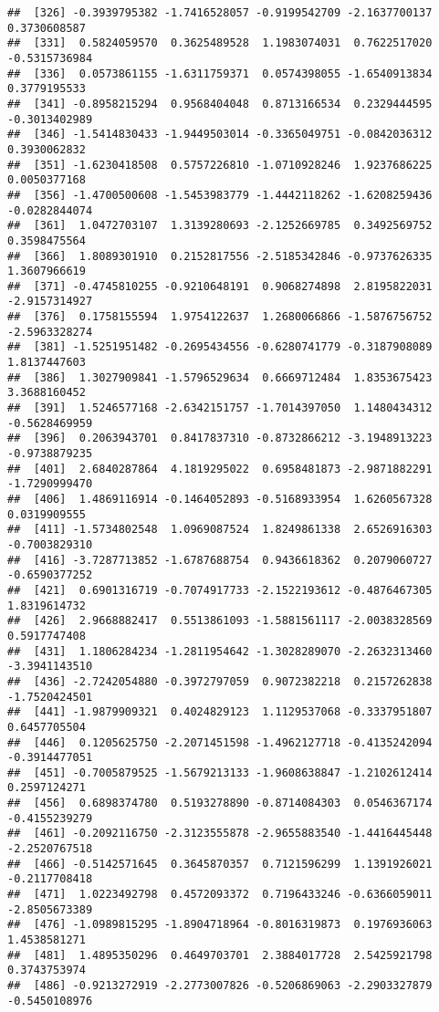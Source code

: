 \documentclass[
]{article}
\begin{document}
\begin{verbatim}
##  [326] -0.3939795382 -1.7416528057 -0.9199542709 -2.1637700137  0.3730608587
##  [331]  0.5824059570  0.3625489528  1.1983074031  0.7622517020 -0.5315736984
##  [336]  0.0573861155 -1.6311759371  0.0574398055 -1.6540913834  0.3779195533
##  [341] -0.8958215294  0.9568404048  0.8713166534  0.2329444595 -0.3013402989
##  [346] -1.5414830433 -1.9449503014 -0.3365049751 -0.0842036312  0.3930062832
##  [351] -1.6230418508  0.5757226810 -1.0710928246  1.9237686225  0.0050377168
##  [356] -1.4700500608 -1.5453983779 -1.4442118262 -1.6208259436 -0.0282844074
##  [361]  1.0472703107  1.3139280693 -2.1252669785  0.3492569752  0.3598475564
##  [366]  1.8089301910  0.2152817556 -2.5185342846 -0.9737626335  1.3607966619
##  [371] -0.4745810255 -0.9210648191  0.9068274898  2.8195822031 -2.9157314927
##  [376]  0.1758155594  1.9754122637  1.2680066866 -1.5876756752 -2.5963328274
##  [381] -1.5251951482 -0.2695434556 -0.6280741779 -0.3187908089  1.8137447603
##  [386]  1.3027909841 -1.5796529634  0.6669712484  1.8353675423  3.3688160452
##  [391]  1.5246577168 -2.6342151757 -1.7014397050  1.1480434312 -0.5628469959
##  [396]  0.2063943701  0.8417837310 -0.8732866212 -3.1948913223 -0.9738879235
##  [401]  2.6840287864  4.1819295022  0.6958481873 -2.9871882291 -1.7290999470
##  [406]  1.4869116914 -0.1464052893 -0.5168933954  1.6260567328  0.0319909555
##  [411] -1.5734802548  1.0969087524  1.8249861338  2.6526916303 -0.7003829310
##  [416] -3.7287713852 -1.6787688754  0.9436618362  0.2079060727 -0.6590377252
##  [421]  0.6901316719 -0.7074917733 -2.1522193612 -0.4876467305  1.8319614732
##  [426]  2.9668882417  0.5513861093 -1.5881561117 -2.0038328569  0.5917747408
##  [431]  1.1806284234 -1.2811954642 -1.3028289070 -2.2632313460 -3.3941143510
##  [436] -2.7242054880 -0.3972797059  0.9072382218  0.2157262838 -1.7520424501
##  [441] -1.9879909321  0.4024829123  1.1129537068 -0.3337951807  0.6457705504
##  [446]  0.1205625750 -2.2071451598 -1.4962127718 -0.4135242094 -0.3914477051
##  [451] -0.7005879525 -1.5679213133 -1.9608638847 -1.2102612414  0.2597124271
##  [456]  0.6898374780  0.5193278890 -0.8714084303  0.0546367174 -0.4155239279
##  [461] -0.2092116750 -2.3123555878 -2.9655883540 -1.4416445448 -2.2520767518
##  [466] -0.5142571645  0.3645870357  0.7121596299  1.1391926021 -0.2117708418
##  [471]  1.0223492798  0.4572093372  0.7196433246 -0.6366059011 -2.8505673389
##  [476] -1.0989815295 -1.8904718964 -0.8016319873  0.1976936063  1.4538581271
##  [481]  1.4895350296  0.4649703701  2.3884017728  2.5425921798  0.3743753974
##  [486] -0.9213272919 -2.2773007826 -0.5206869063 -2.2903327879 -0.5450108976

\end{verbatim}
\end{document}
